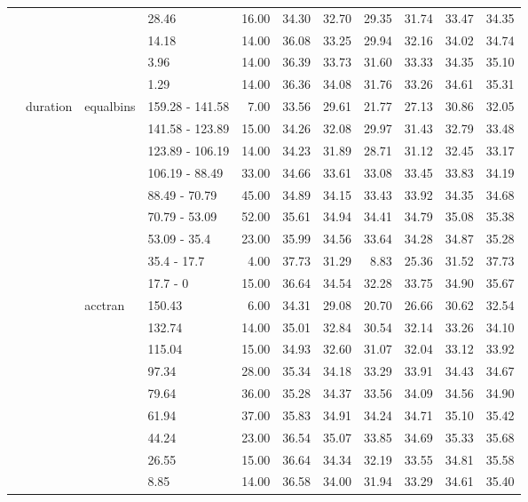 \begin{longtable}{llllrrrrrrr}
   &  &  & 28.46 & 16.00 & 34.30 & 32.70 & 29.35 & 31.74 & 33.47 & 34.35 \\ 
   &  &  & 14.18 & 14.00 & 36.08 & 33.25 & 29.94 & 32.16 & 34.02 & 34.74 \\ 
   &  &  & 3.96 & 14.00 & 36.39 & 33.73 & 31.60 & 33.33 & 34.35 & 35.10 \\ 
   &  &  & 1.29 & 14.00 & 36.36 & 34.08 & 31.76 & 33.26 & 34.61 & 35.31 \\ 
   & duration & equalbins & 159.28 - 141.58 & 7.00 & 33.56 & 29.61 & 21.77 & 27.13 & 30.86 & 32.05 \\ 
   &  &  & 141.58 - 123.89 & 15.00 & 34.26 & 32.08 & 29.97 & 31.43 & 32.79 & 33.48 \\ 
   &  &  & 123.89 - 106.19 & 14.00 & 34.23 & 31.89 & 28.71 & 31.12 & 32.45 & 33.17 \\ 
   &  &  & 106.19 - 88.49 & 33.00 & 34.66 & 33.61 & 33.08 & 33.45 & 33.83 & 34.19 \\ 
   &  &  & 88.49 - 70.79 & 45.00 & 34.89 & 34.15 & 33.43 & 33.92 & 34.35 & 34.68 \\ 
   &  &  & 70.79 - 53.09 & 52.00 & 35.61 & 34.94 & 34.41 & 34.79 & 35.08 & 35.38 \\ 
   &  &  & 53.09 - 35.4 & 23.00 & 35.99 & 34.56 & 33.64 & 34.28 & 34.87 & 35.28 \\ 
   &  &  & 35.4 - 17.7 & 4.00 & 37.73 & 31.29 & 8.83 & 25.36 & 31.52 & 37.73 \\ 
   &  &  & 17.7 - 0 & 15.00 & 36.64 & 34.54 & 32.28 & 33.75 & 34.90 & 35.67 \\ 
   &  & acctran & 150.43 & 6.00 & 34.31 & 29.08 & 20.70 & 26.66 & 30.62 & 32.54 \\ 
   &  &  & 132.74 & 14.00 & 35.01 & 32.84 & 30.54 & 32.14 & 33.26 & 34.10 \\ 
   &  &  & 115.04 & 15.00 & 34.93 & 32.60 & 31.07 & 32.04 & 33.12 & 33.92 \\ 
   &  &  & 97.34 & 28.00 & 35.34 & 34.18 & 33.29 & 33.91 & 34.43 & 34.67 \\ 
   &  &  & 79.64 & 36.00 & 35.28 & 34.37 & 33.56 & 34.09 & 34.56 & 34.90 \\ 
   &  &  & 61.94 & 37.00 & 35.83 & 34.91 & 34.24 & 34.71 & 35.10 & 35.42 \\ 
   &  &  & 44.24 & 23.00 & 36.54 & 35.07 & 33.85 & 34.69 & 35.33 & 35.68 \\ 
   &  &  & 26.55 & 15.00 & 36.64 & 34.34 & 32.19 & 33.55 & 34.81 & 35.58 \\ 
   &  &  & 8.85 & 14.00 & 36.58 & 34.00 & 31.94 & 33.29 & 34.61 & 35.40 \\ 

\end{longtable}
